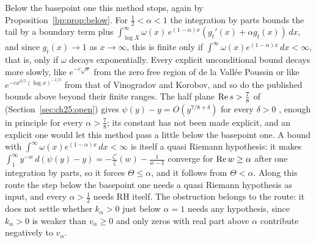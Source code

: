Below the basepoint one this method stops, again by Proposition~\ref{bp:prop:below}. For $\frac12<\alpha<1$ the integration by parts bounds the tail by a boundary term plus $\int_{\log X}^\infty\omega(x)\,e^{(1-\alpha)x}(g_t'(x)+\alpha g_t(x))\,dx$, and since $g_t(x)\to1$ as $x\to\infty$, this is finite only if $\int^\infty\omega(x)e^{(1-\alpha)x}\,dx<\infty$, that is, only if $\omega$ decays exponentially. Every explicit unconditional bound decays more slowly, like $e^{-c\sqrt x}$ from the zero free region of de la Vall\'ee Poussin or like $e^{-cx^{3/5}(\log x)^{-1/5}}$ from that of Vinogradov and Korobov, and so do the published bounds above beyond their finite ranges. The half plane $\operatorname{Re} s>\frac78$ of \cite{OAI26a} (Section~\ref{sec:ch25:open}) gives $\psi(y)-y=O(y^{7/8+\delta})$ for every $\delta>0$ \cite{Titchmarsh}, enough in principle for every $\alpha>\frac78$; its constant has not been made explicit, and an explicit one would let this method pass a little below the basepoint one. A bound with $\int^\infty\omega(x)e^{(1-\alpha)x}\,dx<\infty$ is itself a quasi Riemann hypothesis: it makes $\int_1^\infty y^{-w}\,d(\psi(y)-y)=-\frac{\zeta'}\zeta(w)-\frac1{w-1}$ converge for $\operatorname{Re} w\ge\alpha$ after one integration by parts, so it forces $\Theta\le\alpha$, and it follows from $\Theta<\alpha$. Along this route the step below the basepoint one needs a quasi Riemann hypothesis as input, and every $\alpha>\frac12$ needs RH itself. The obstruction belongs to the route: it does not settle whether $k_\alpha>0$ just below $\alpha=1$ needs any hypothesis, since $k_\alpha>0$ is weaker than $v_\alpha\ge0$ and only zeros with real part above $\alpha$ contribute negatively to $v_\alpha$.

